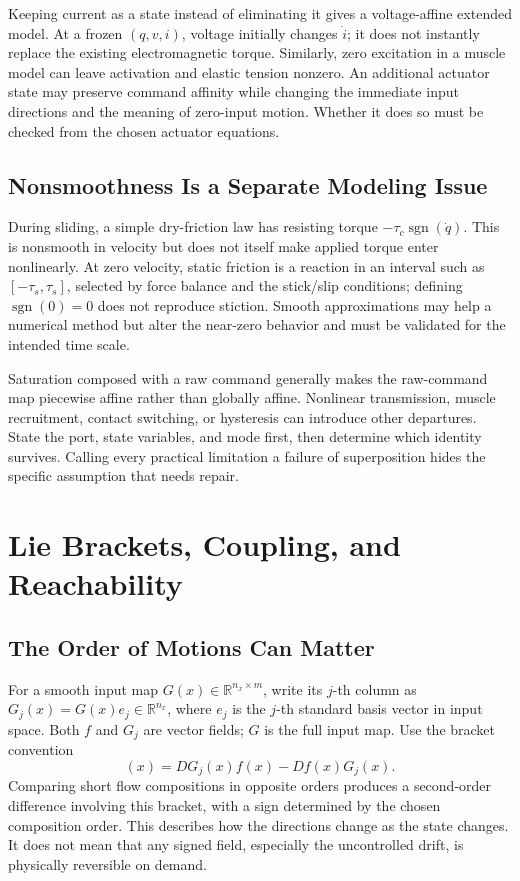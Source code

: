 Keeping current as a state instead of eliminating it gives a voltage-affine extended model. At a frozen $(q,v,i)$, voltage initially changes $\dot i$; it does not instantly replace the existing electromagnetic torque. Similarly, zero excitation in a muscle model can leave activation and elastic tension nonzero. An additional actuator state may preserve command affinity while changing the immediate input directions and the meaning of zero-input motion. Whether it does so must be checked from the chosen actuator equations.

\subsection{Nonsmoothness Is a Separate Modeling Issue}

During sliding, a simple dry-friction law has resisting torque $-\tau_c\operatorname{sgn}(\dot q)$. This is nonsmooth in velocity but does not itself make applied torque enter nonlinearly. At zero velocity, static friction is a reaction in an interval such as $[-\tau_s,\tau_s]$, selected by force balance and the stick/slip conditions; defining $\operatorname{sgn}(0)=0$ does not reproduce stiction. Smooth approximations may help a numerical method but alter the near-zero behavior and must be validated for the intended time scale.

Saturation composed with a raw command generally makes the raw-command map piecewise affine rather than globally affine. Nonlinear transmission, muscle recruitment, contact switching, or hysteresis can introduce other departures. State the port, state variables, and mode first, then determine which identity survives. Calling every practical limitation a failure of superposition hides the specific assumption that needs repair.

\section{Lie Brackets, Coupling, and Reachability}

\subsection{The Order of Motions Can Matter}

For a smooth input map $G(x)\in\mathbb R^{n_x\times m}$, write its $j$-th column as $G_j(x)=G(x)e_j\in\mathbb R^{n_x}$, where $e_j$ is the $j$-th standard basis vector in input space. Both $f$ and $G_j$ are vector fields; $G$ is the full input map. Use the bracket convention
\begin{equation}
[f,G_j](x)=DG_j(x)f(x)-Df(x)G_j(x).
\label{eq:ch3:lie-bracket}
\end{equation}
Comparing short flow compositions in opposite orders produces a second-order difference involving this bracket, with a sign determined by the chosen composition order. This describes how the directions change as the state changes. It does not mean that any signed field, especially the uncontrolled drift, is physically reversible on demand.

